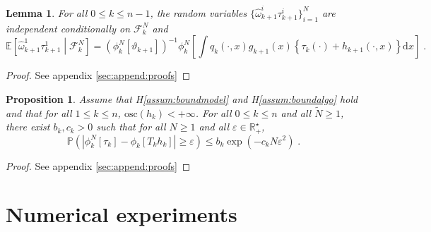 \documentclass[12pt,draft]{article}
\newcommand{\rmd}{\mathrm{d}}
\newcommand{\eqsp}{\;}
\newcommand{\1}{\mathrm{1}}
\newtheorem{lemma}{Lemma}
\newtheorem{proposition}{Proposition}
\begin{document}
\begin{lemma}
\label{lem:iid}
For all $0\le k \le n-1$, the random variables $\{\widehat{\omega}_{k+1}^i\tau_{k+1}^i\}_{i=1}^N$ are independent conditionally on $\mathcal{F}_k^{N}$ and%
\[
\mathbb{E}\left[\widehat{\omega}^1_{k+1}\tau^{1}_{k+1}\middle| \mathcal{F}_k^{N}\right] = \left(\phi^N_{k}[\vartheta_{k+1}]\right)^{-1}\phi^N_{k}\left[\int q_{k}(\cdot,x)g_{k+1}(x)\left\{\tau_k(\cdot) + h_{k+1}(\cdot,x)\right\}\rmd x\right]\eqsp.
\]
\end{lemma}

\begin{proof}
See appendix \ref{sec:append:proofs}
\end{proof}

\begin{proposition}
\label{prop:exp:deviation}
Assume that H\ref{assum:boundmodel} and H\ref{assum:boundalgo} hold and that for all $1\le k\le n$, $\mathrm{osc}(h_k)<+\infty$. For all $0\le k\le n$ and all $\widetilde{N}\ge 1$, there exist $b_k,c_k>0$ such that for all $N\ge 1$ and all $\varepsilon\in\mathbb{R}_+^\star$,
\[
\mathbb{P}\left(\left|\phi_k^N[\tau_k] - \phi_k\left[T_kh_k\right]\right|\ge \varepsilon\right)\le b_k\exp\left(-c_kN\varepsilon^2\right)\eqsp.
\]
\end{proposition}

\begin{proof}
See appendix \ref{sec:append:proofs}
\end{proof}


\section{Numerical experiments}
\label{sec:exp}
\end{document}
